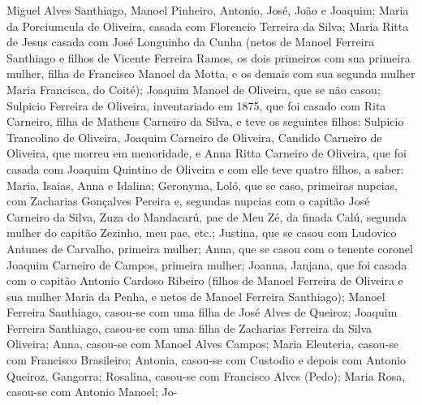 Miguel Alves Santhiago, Manoel Pinheiro, Antonio, José, João e Joaquim; Maria da Porciumcula de Oliveira, casada com Florencio Terreira da Silva; Maria Ritta de Jesus casada com José Longuinho da Cunha (netos de Manoel Ferreira Santhiago e filhos de Vicente Ferreira Ramos, os dois primeiros com sua primeira mulher, filha de Francisco Manoel da Motta, e os demais com sua segunda mulher Maria Francisca, do Coité); Joaquim Manoel de Oliveira, que se não casou; Sulpicio Ferreira de Oliveira, inventariado em 1875, que foi casado com Rita Carneiro, filha de Matheus Carneiro da Silva, e teve os seguintes filhos: Sulpicio Trancolino de Oliveira,
Joaquim Carneiro de Oliveira, Candido Carneiro de Oliveira, que morreu em menoridade, e Anna Ritta Carneiro de Oliveira, que foi casada com Joaquim Quintino de Oliveira e com elle teve quatro filhos, a saber: Maria, Isaias, Anna e Idalina; Geronyma, Loló, que se caso, primeiras nupcias, com Zacharias Gonçalves Pereira e, segundas nupcias com o capitão José Carneiro da Silva, Zuza do Mandacarú, pae de Meu Zé, da finada Calú, segunda mulher do capitão Zezinho, meu pae, etc.; Justina, que se casou com Ludovico Antunes de Carvalho, primeira mulher; Anna, que se casou com o tenente coronel Joaquim Carneiro de Campos, primeira mulher; Joanna, Janjana, que foi casada com o capitão Antonio Cardoso Ribeiro (filhos de Manoel Ferreira de Oliveira e sua mulher Maria da Penha, e netos de Manoel Ferreira Santhiago); Manoel Ferreira Santhiago, casou-se com uma filha de José Alves de Queiroz; Joaquim Ferreira Santhiago, casou-se com uma filha de Zacharias Ferreira da Silva Oliveira; Anna, casou-se com Manoel Alves Campos; Maria Eleuteria, casou-se com Francisco Brasileiro; Antonia, casou-se com Custodio e depois com Antonio Queiroz, Gangorra; Rosalina, casou-se com Francisco Alves (Pedo); Maria Rosa, casou-se com Antonio Manoel; Jo- %

